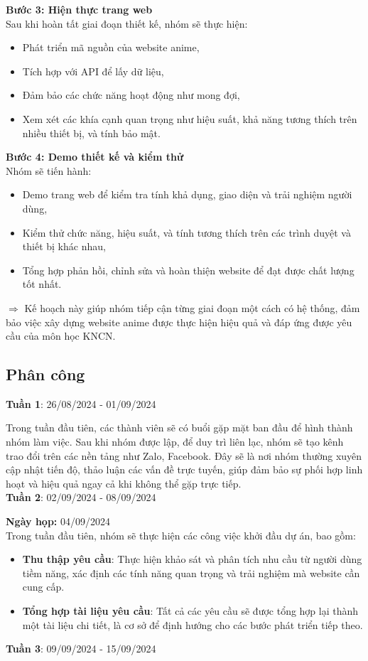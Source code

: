 \textbf{Bước 3: Hiện thực trang web} \\
Sau khi hoàn tất giai đoạn thiết kế, nhóm sẽ thực hiện:
\begin{itemize}
    \item Phát triển mã nguồn của website anime,
    \item Tích hợp với API để lấy dữ liệu,
    \item Đảm bảo các chức năng hoạt động như mong đợi,
    \item Xem xét các khía cạnh quan trọng như hiệu suất, khả năng tương thích trên nhiều thiết bị, và tính bảo mật.
\end{itemize}

\textbf{Bước 4: Demo thiết kế và kiểm thử} \\
Nhóm sẽ tiến hành:
\begin{itemize}
    \item Demo trang web để kiểm tra tính khả dụng, giao diện và trải nghiệm người dùng,
    \item Kiểm thử chức năng, hiệu suất, và tính tương thích trên các trình duyệt và thiết bị khác nhau,
    \item Tổng hợp phản hồi, chỉnh sửa và hoàn thiện website để đạt được chất lượng tốt nhất.
\end{itemize}

$\Rightarrow$ Kế hoạch này giúp nhóm tiếp cận từng giai đoạn một cách có hệ thống, đảm bảo việc xây dựng website anime được thực hiện hiệu quả và đáp ứng được yêu cầu của môn học KNCN.

\subsection{Phân công}

\textbf{Tuần 1}: 26/08/2024 - 01/09/2024

Trong tuần đầu tiên, các thành viên sẽ có buổi gặp mặt ban đầu để hình thành nhóm làm việc. Sau khi nhóm được lập, để duy trì liên lạc, nhóm sẽ tạo kênh trao đổi trên các nền tảng như Zalo, Facebook. Đây sẽ là nơi nhóm thường xuyên cập nhật tiến độ, thảo luận các vấn đề trực tuyến, giúp đảm bảo sự phối hợp linh hoạt và hiệu quả ngay cả khi không thể gặp trực tiếp.
\vspace{1cm}
\\
\textbf{Tuần 2}: 02/09/2024 - 08/09/2024

\textbf{Ngày họp:} 04/09/2024 \\
Trong tuần đầu tiên, nhóm sẽ thực hiện các công việc khởi đầu dự án, bao gồm:
\begin{itemize}
    \item \textbf{Thu thập yêu cầu}: Thực hiện khảo sát và phân tích nhu cầu từ người dùng tiềm năng, xác định các tính năng quan trọng và trải nghiệm mà website cần cung cấp.
    \item \textbf{Tổng hợp tài liệu yêu cầu}: Tất cả các yêu cầu sẽ được tổng hợp lại thành một tài liệu chi tiết, là cơ sở để định hướng cho các bước phát triển tiếp theo.
\end{itemize}
\vspace{1cm}
\textbf{Tuần 3}: 09/09/2024 - 15/09/2024

